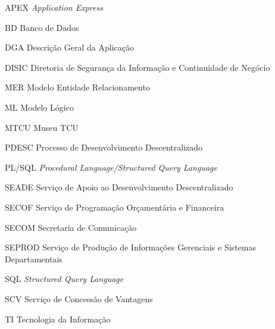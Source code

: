 \begin{siglas}
  \item [APEX] \textit{Application Express}
  \item [BD] Banco de Dados
  \item [DGA] Descrição Geral da Aplicação
  \item [DISIC] Diretoria de Segurança da Informação e Continuidade de Negócio
  \item [MER] Modelo Entidade Relacionamento
  \item [ML] Modelo Lógico
  \item [MTCU] Museu TCU
  \item [PDESC] Processo de Desenvolvimento Descentralizado
  \item [PL/SQL] \textit{Procedural Language/Structured Query Language}
  \item [SEADE] Serviço de Apoio ao Desenvolvimento Descentralizado
  \item [SECOF] Serviço de Programação Orçamentária e Financeira
  \item [SECOM] Secretaria de Comunicação
  \item [SEPROD] Serviço de Produção de Informações Gerenciais e Sistemas Departamentais
  \item [SQL] \textit{Structured Query Language}
  \item [SCV] Serviço de Concessão de Vantagens
  \item [TI] Tecnologia da Informação
\end{siglas}

